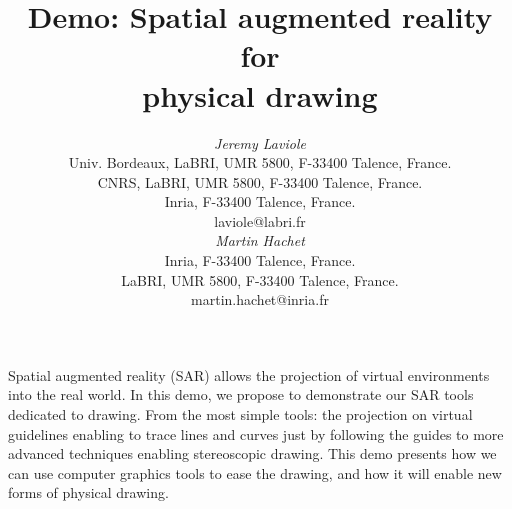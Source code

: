 \documentclass{article}
\begin{document}




\title{Demo: Spatial augmented reality for \\
       physical drawing}


\author{
\parbox[t]{9cm}{\centering
	     {\em Jeremy Laviole}\\
	     Univ. Bordeaux, LaBRI, UMR 5800, F-33400 Talence, France.\\
         CNRS, LaBRI, UMR 5800, F-33400 Talence, France.\\
	     Inria, F-33400 Talence, France.\\
	     laviole@labri.fr}
	     
\parbox[t]{9cm}{\centering
	     {\em Martin Hachet}\\
	     Inria, F-33400 Talence, France.\\
	     LaBRI, UMR 5800, F-33400 Talence, France.\\
	     martin.hachet@inria.fr}
}


\maketitle

\abstract
Spatial augmented reality (SAR) allows the projection of virtual environments into the real world. In this demo, we propose to demonstrate our SAR tools dedicated to drawing. 
From the most simple tools: the projection on virtual guidelines enabling to trace lines and curves just by following the guides to more advanced techniques enabling stereoscopic drawing. This demo presents how we can use computer graphics tools to ease the drawing, and how it will enable new forms of physical drawing. 
\end{document}
